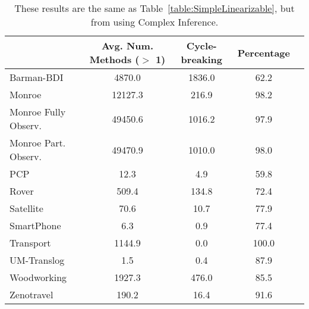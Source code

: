 \begin{table}
	\centering
	\caption{These results are the same as Table~\ref{table:SimpleLinearizable}, but from using Complex Inference.}
	\label{table:ComplexLinearizable}
	\scalebox{0.65} {
	\begin{tabular}{lcccl}
		\toprule
		&  Avg. Num. Methods ($>$ 1)& Cycle-breaking & Percentage &  \\
		\midrule
			Barman-BDI &  4870.0 & 1836.0 & 62.2  \\
			Monroe & 12127.3 & 216.9 & 98.2  \\
			Monroe Fully Observ. & 49450.6 & 1016.2 & 97.9  \\
			Monroe Part. Observ. & 49470.9 & 1010.0 & 98.0  \\
			PCP & 12.3 & 4.9 & 59.8  \\
			Rover & 509.4 & 134.8 & 72.4  \\
			Satellite & 70.6 & 10.7 & 77.9  \\
			SmartPhone & 6.3 & 0.9 & 77.4  \\
			Transport & 1144.9 & 0.0 & 100.0  \\
			UM-Translog & 1.5 & 0.4 & 87.9  \\
			Woodworking & 1927.3 & 476.0 & 85.5  \\
			Zenotravel & 190.2 & 16.4 & 91.6  \\
			\bottomrule
		\end{tabular}
		}
\end{table}
